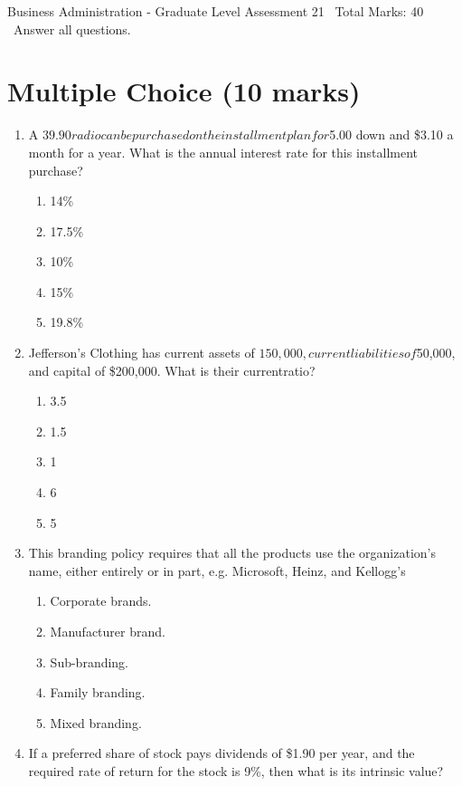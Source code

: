 \documentclass[12pt]{article}
\begin{document}
\begin{center}
Business Administration - Graduate Level Assessment 21 \
Total Marks: 40 \
Answer all questions.
\end{center}

\section*{Multiple Choice (10 marks)}
\begin{enumerate}[label=\arabic*.]
\item A $39.90 radio can be purchased on the installment plan for $5.00 down and \$3.10 a month for a year. What is the annual interest rate for this installment purchase?
\begin{enumerate}[label=(\alph*)]
    \item 14\%
    \item 17.5\%
    \item 10\%
    \item 15\%
    \item 19.8\%
\end{enumerate}
\item Jefferson's Clothing has current assets of $150,000, current liabilitiesof $50,000, and capital of \$200,000. What is their currentratio?
\begin{enumerate}[label=(\alph*)]
    \item 3.5
    \item 1.5
    \item 1
    \item 6
    \item 5
\end{enumerate}
\item This branding policy requires that all the products use the organization's name, either entirely or in part, e.g. Microsoft, Heinz, and Kellogg's
\begin{enumerate}[label=(\alph*)]
    \item Corporate brands.
    \item Manufacturer brand.
    \item Sub-branding.
    \item Family branding.
    \item Mixed branding.
\end{enumerate}
\item If a preferred share of stock pays dividends of \$1.90 per year, and the required rate of return for the stock is 9\%, then what is its intrinsic value?
\begin{enumerate}[label=(\alph*)]

\end{enumerate}
\end{enumerate}
\end{document}

